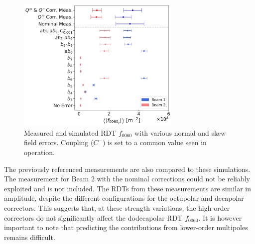 \begin{figure}[!htb]
    \centering
    \includegraphics[width=0.7\textwidth]{./images/simulations_f0060.pdf}
    \caption{Measured and simulated RDT $f_{0060}$ with various normal and skew field errors.
    Coupling ($C^{-}$) is set to a common value seen in operation.}
    \label{fig:high_orders:simulations_f0060}
\end{figure}

The previously referenced measurements are also compared to these simulations. The measurement for
Beam 2 with the nominal corrections could not be reliably exploited and is not included.  The RDTs
from these measurements are similar in amplitude, despite the different configurations for the
octupolar and decapolar correctors. This suggests that, at these strength variations, the high-order
correctors do not significantly affect the dodecapolar RDT $f_{0060}$. It is however important to
note that predicting the contributions from lower-order multipoles remains difficult.
